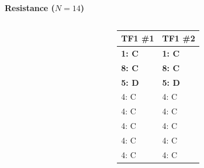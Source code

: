 \documentclass{beamer}
\newcommand{\moranresearchfolder}{$HOME/rsc/axelrod-moran}
\begin{document}
    \begin{frame}
        \scriptsize
        \begin{center}
            \textbf{Resistance (\(N=14\))}\\

            
        \end{center}

    \end{frame}

    \begin{frame}
        \begin{columns}
            \begin{column}{.6\textwidth}
                \begin{center}
                    \scalebox{.49}{
                        
                    }
                \end{center}
            \end{column}

            \begin{column}{.4\textwidth}
                \small
                \begin{tabular}{ll}
                    \toprule
                    TF1 \#1   & TF1 \#2\\
                    \midrule
                    \bf{1}: C & \bf{1}: C  \\
                    \bf{8}: C & \bf{8}: C  \\
                    \bf{5}: D & \bf{5}: D  \\
                    4: C      & 4: C  \\
                    4: C      & 4: C  \\
                    4: C      & 4: C  \\
                    4: C      & 4: C  \\
                    4: C      & 4: C  \\
                    \bottomrule
                \end{tabular}
            \end{column}
        \end{columns}


\end{frame}
\end{document}
